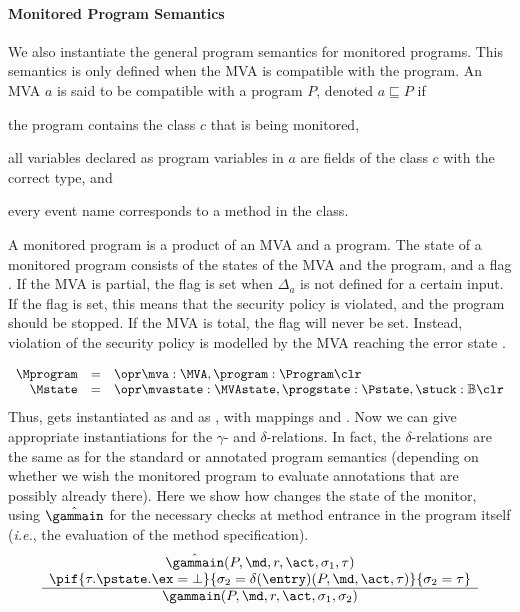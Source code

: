\paragraph{Monitored Program Semantics}
We also instantiate the general program semantics for monitored
programs. This semantics is only defined when the MVA is compatible with
the program. An MVA \(a\) is said to be compatible with a program \(P\),
denoted \(a \sqsubseteq P\) if
\begin{inparaenum}
\item the program contains the class \(c\) that is being monitored,
\item all variables declared as program variables in
\(a\) are fields of the class \(c\) with the correct type, and
\item every event name corresponds to a method in the class.
\end{inparaenum}
A monitored program is a product of an MVA and a program. The state
of a monitored program consists of the states of the MVA and the
program, and a flag \stuck. If the MVA is partial, the flag
\stuck is set when \(\Delta_a\) is not defined for a
certain input. If the flag is set, this means that the security policy
is violated, and the program should be stopped. If the MVA is total,
the \stuck flag will never be set. Instead, violation of the security
policy is modelled by the MVA reaching the error state \halted.

\[
\begin{array}{rcl}
\Mprogram & =  & \opr \mva : \MVA, \program : \Program \clr\\
\Mstate & = & \opr \mvastate : \MVAstate, \progstate : \Pstate, \stuck
: \mathbb{B} \clr
\end{array}
\]
Thus, \FullProgram gets instantiated as \Mprogram and \FullState as
\Mstate, with mappings \program and \progstate. Now we can give
appropriate instantiations for the \(\gamma\)- and
\(\delta\)-relations. In fact, the \(\delta\)-relations are the same as
for the standard or annotated program semantics (depending on whether
we wish the monitored program to evaluate annotations that are
possibly already there). Here we show how \gammain changes the state
of the monitor, using \(\hat\gammain\) for the necessary checks at
method entrance in the program itself (\emph{i.e.}, the evaluation of
the method specification).
\[
\begin{array}{c}
\hat\gammain(P, \md, r, \act, \sigma_1, \tau) \\
\pif{\tau.\pstate.\ex = \bot}
    {\sigma_2 = \delta(\entry)(P, \md, \act, \tau)}
    {\sigma_2 = \tau}\\
\hline
\gammain(P, \md, r, \act, \sigma_1, \sigma_2)
\end{array}
\]

